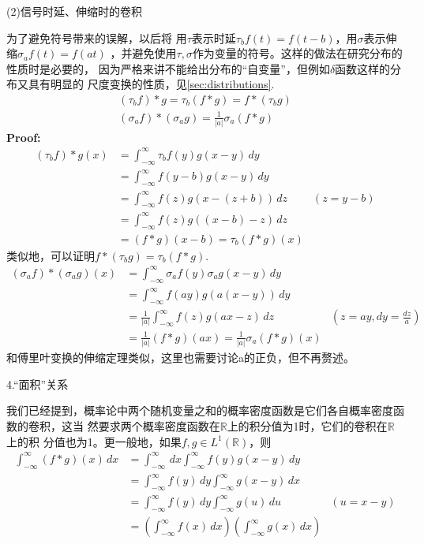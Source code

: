 \documentclass{ctexbook}
\begin{document}
\noindent (2)信号时延、伸缩时的卷积

为了避免符号带来的误解，以后将
用$\tau$表示时延$\tau_b f(t)=f(t-b)$，用$\sigma$表示伸缩$\sigma_a f(t)=f(at)$
，并避免使用$\tau,\sigma$作为变量的符号。这样的做法在研究分布的性质时是必要的，
因为严格来讲不能给出分布的“自变量”，但例如$\delta$函数这样的分布又具有明显的
尺度变换的性质，见\ref{sec:distributions}.
\begin{align*}
    (\tau_b f)*g=\tau_b (f*g)=f*(\tau_b g) \\
    (\sigma_a f)*(\sigma_a g)=\frac{1}{|a|}\sigma_a(f*g)
\end{align*}
\textbf{Proof:}
\begin{align*}
    (\tau_b f)*g(x) & =\int_{-\infty}^{\infty}\tau_b f(y)g(x-y)\,dy           \\
                    & =\int_{-\infty}^{\infty}f(y-b)g(x-y)\,dy                \\
                    & =\int_{-\infty}^{\infty}f(z)g(x-(z+b))\,dz    & (z=y-b) \\
                    & =\int_{-\infty}^{\infty}f(z)g((x-b)-z)\,dz              \\
                    & =(f*g)(x-b)=\tau_b (f*g)(x)
\end{align*}
类似地，可以证明$f*(\tau_b g)=\tau_b (f*g)$.
\begin{align*}
    (\sigma_a f)*(\sigma_a g)(x) & =\int_{-\infty}^{\infty}\sigma_a f(y)\sigma_a g(x-y)\,dy                          \\
                                 & =\int_{-\infty}^{\infty}f(ay)g(a(x-y))\,dy                                        \\
                                 & =\frac{1}{|a|}\int_{-\infty}^{\infty}f(z)g(a x - z)\,dz  & (z=ay,dy=\frac{dz}{a}) \\
                                 & =\frac{1}{|a|}(f*g)(a x)=\frac{1}{|a|}\sigma_a(f*g)(x)
\end{align*}
和傅里叶变换的伸缩定理类似，这里也需要讨论a的正负，但不再赘述。

4.“面积”关系

我们已经提到，概率论中两个随机变量之和的概率密度函数是它们各自概率密度函数的卷积，这当
然要求两个概率密度函数在$\mathbb{R}$上的积分值为1时，它们的卷积在$\mathbb{R}$上的积
分值也为1。更一般地，如果$f,g\in L^1(\mathbb{R})$，则
\begin{align*}
    \int_{-\infty}^{\infty}(f*g)(x)\,dx & =\int_{-\infty}^{\infty}\,dx\int_{-\infty}^{\infty}f(y)g(x-y)\,dy                                   \\
                                        & =\int_{-\infty}^{\infty}f(y)\,dy\int_{-\infty}^{\infty}g(x-y)\,dx                                   \\
                                        & =\int_{-\infty}^{\infty}f(y)\,dy\int_{-\infty}^{\infty}g(u)\,du                           & (u=x-y) \\
                                        & =\left(\int_{-\infty}^{\infty}f(x)\,dx\right)\left(\int_{-\infty}^{\infty}g(x)\,dx\right)
\end{align*}
\end{document}
